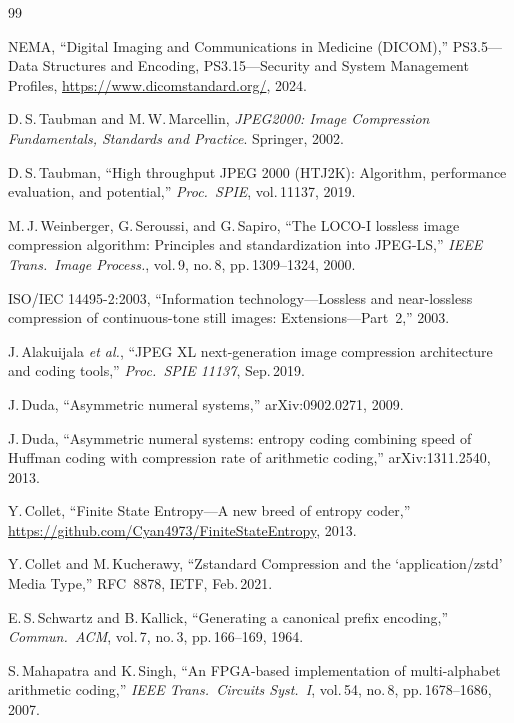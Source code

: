 \documentclass[journal]{IEEEtran}
\begin{document}

\begin{thebibliography}{99}

NEMA, ``Digital Imaging and Communications in Medicine (DICOM),''
PS3.5---Data Structures and Encoding, PS3.15---Security and System Management
Profiles,
\url{https://www.dicomstandard.org/}, 2024.

D.\,S.\,Taubman and M.\,W.\,Marcellin,
\textit{JPEG2000: Image Compression Fundamentals, Standards and Practice}.
Springer, 2002.

D.\,S.\,Taubman, ``High throughput JPEG 2000 (HTJ2K): Algorithm, performance
evaluation, and potential,'' \textit{Proc.\ SPIE}, vol.\,11137, 2019.

M.\,J.\,Weinberger, G.\,Seroussi, and G.\,Sapiro,
``The LOCO-I lossless image compression algorithm: Principles and
standardization into JPEG-LS,''
\textit{IEEE Trans.\ Image Process.}, vol.\,9, no.\,8, pp.\,1309--1324, 2000.

ISO/IEC 14495-2:2003, ``Information technology---Lossless and near-lossless
compression of continuous-tone still images: Extensions---Part~2,'' 2003.

J.\,Alakuijala \textit{et al.},
``JPEG XL next-generation image compression architecture and coding tools,''
\textit{Proc.\ SPIE 11137}, Sep.\,2019.

J.\,Duda, ``Asymmetric numeral systems,'' arXiv:0902.0271, 2009.

J.\,Duda, ``Asymmetric numeral systems: entropy coding combining speed of
Huffman coding with compression rate of arithmetic coding,''
arXiv:1311.2540, 2013.

Y.\,Collet, ``Finite State Entropy---A new breed of entropy coder,''
\url{https://github.com/Cyan4973/FiniteStateEntropy}, 2013.

Y.\,Collet and M.\,Kucherawy,
``Zstandard Compression and the `application/zstd' Media Type,''
RFC~8878, IETF, Feb.\,2021.

E.\,S.\,Schwartz and B.\,Kallick,
``Generating a canonical prefix encoding,''
\textit{Commun.\ ACM}, vol.\,7, no.\,3, pp.\,166--169, 1964.

S.\,Mahapatra and K.\,Singh,
``An FPGA-based implementation of multi-alphabet arithmetic coding,''
\textit{IEEE Trans.\ Circuits Syst.\ I}, vol.\,54, no.\,8, pp.\,1678--1686,
2007.


\end{thebibliography}
\end{document}
